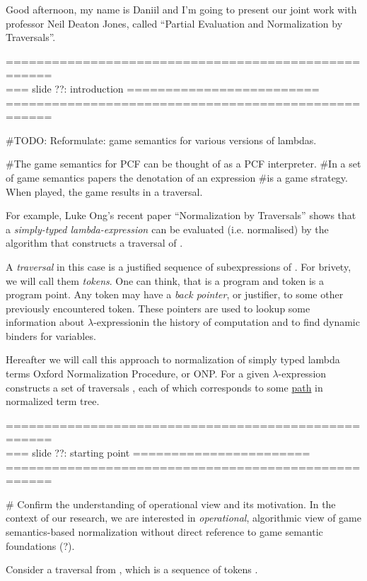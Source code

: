 \documentclass[a4paper, 10pt]{article} %
\newcommand{\red}[1]{{\color{red}#1}}
\newcommand{\green}[1]{{\color{blue!20!black!30!green}#1}}
\newcommand{\blue}[1]{{\color{blue}#1}}
\newcommand{\lam}[1]{{\color{brown}\emph{\boldmath{#1}}}}
\newcommand{\lexp}{$\lambda$-expression}
\begin{document}
Good afternoon, my name is Daniil and I'm going to present our joint work with 
professor Neil Deaton Jones, called ``Partial Evaluation and Normalization by 
Traversals''. 


====================================================\\
=== slide ??: introduction =========================\\
====================================================


\#TODO:
Reformulate: game semantics for various versions of lambdas.

\#The game semantics for PCF can be thought of as a PCF interpreter.
\#In a set of game semantics papers the denotation of an expression
\#is a game strategy. When played, the game results in a traversal.

For example, Luke Ong’s recent paper ``Normalization by Traversals''
shows that a \blue{\emph{simply-typed lambda-expression \lam{M}}}
can be \red{evaluated} (i.e. normalised) by the algorithm that
constructs a \green{traversal} of \lam{M}.

A \green{\emph{traversal}} in this case is a justified sequence
of subexpressions of \lam{M}. For brivety, we will call them
\green{\emph{tokens}}.  One can think, that \lam{$M$} is 
a \blue{program} and token is a \blue{program point}. Any token
may have a \green{\emph{back pointer}}, or justifier, to some other 
previously encountered token. These pointers are used to lookup some 
information about \lexp in the history of computation and to find
dynamic binders for variables.

Hereafter we will call this approach to normalization of simply typed
lambda terms Oxford Normalization Procedure, or ONP. For a given \lexp
\lam{$M$} \lam{ONP} constructs a set of traversals
\lam{$\mathfrak{Trav}(M)$}, each of which corresponds to some
\underline{path} in normalized term tree.


====================================================\\
=== slide ??: starting point =======================\\
====================================================

\# Confirm the understanding of operational view and its motivation.
In the context of our research, we are interested in \emph{operational}, 
algorithmic view of game semantics-based normalization without direct
reference to game semantic foundations (?).

Consider a traversal \lam{$tr$} from \lam{$\mathfrak{Trav}(M)$}, which is
a sequence of tokens \lam{$t_0$} \lam{$t_n$}.
\end{document}
